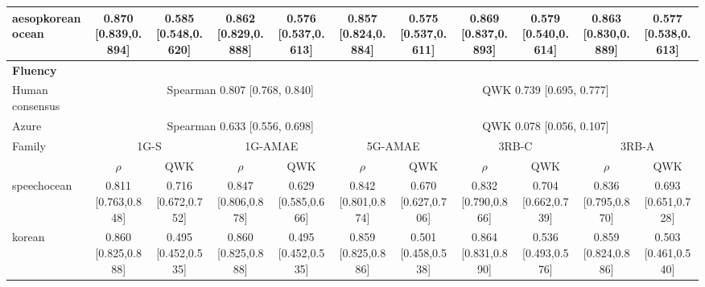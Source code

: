 \documentclass[10pt]{article}
\begin{document}
\begin{landscape}
\begin{longtable}{@{}l*{10}{c}@{}}
aesopkoreanocean & \shortstack{0.870\\{}[0.839,0.894]} & \shortstack{0.585\\{}[0.548,0.620]} & \shortstack{0.862\\{}[0.829,0.888]} & \shortstack{0.576\\{}[0.537,0.613]} & \shortstack{0.857\\{}[0.824,0.884]} & \shortstack{0.575\\{}[0.537,0.611]} & \shortstack{0.869\\{}[0.837,0.893]} & \shortstack{0.579\\{}[0.540,0.614]} & \shortstack{0.863\\{}[0.830,0.889]} & \shortstack{0.577\\{}[0.538,0.613]}\\
\midrule
\multicolumn{11}{l}{\textbf{Fluency}}\\*
\toprule
Human consensus & \multicolumn{5}{c}{Spearman 0.807 [0.768, 0.840]} & \multicolumn{5}{c}{QWK 0.739 [0.695, 0.777]}\\
Azure & \multicolumn{5}{c}{Spearman 0.633 [0.556, 0.698]} & \multicolumn{5}{c}{QWK 0.078 [0.056, 0.107]}\\
\midrule
Family & \multicolumn{2}{c}{1G-S} & \multicolumn{2}{c}{1G-AMAE} & \multicolumn{2}{c}{5G-AMAE} & \multicolumn{2}{c}{3RB-C} & \multicolumn{2}{c}{3RB-A}\\
 & $\rho$ & QWK & $\rho$ & QWK & $\rho$ & QWK & $\rho$ & QWK & $\rho$ & QWK\\
\midrule
speechocean & \shortstack{0.811\\{}[0.763,0.848]} & \shortstack{0.716\\{}[0.672,0.752]} & \shortstack{0.847\\{}[0.806,0.878]} & \shortstack{0.629\\{}[0.585,0.666]} & \shortstack{0.842\\{}[0.801,0.874]} & \shortstack{0.670\\{}[0.627,0.706]} & \shortstack{0.832\\{}[0.790,0.866]} & \shortstack{0.704\\{}[0.662,0.739]} & \shortstack{0.836\\{}[0.795,0.870]} & \shortstack{0.693\\{}[0.651,0.728]}\\
korean & \shortstack{0.860\\{}[0.825,0.888]} & \shortstack{0.495\\{}[0.452,0.535]} & \shortstack{0.860\\{}[0.825,0.888]} & \shortstack{0.495\\{}[0.452,0.535]} & \shortstack{0.859\\{}[0.825,0.886]} & \shortstack{0.501\\{}[0.458,0.538]} & \shortstack{0.864\\{}[0.831,0.890]} & \shortstack{0.536\\{}[0.493,0.576]} & \shortstack{0.859\\{}[0.824,0.886]} & \shortstack{0.503\\{}[0.461,0.540]}\\

\end{longtable}
\end{landscape}
\end{document}
